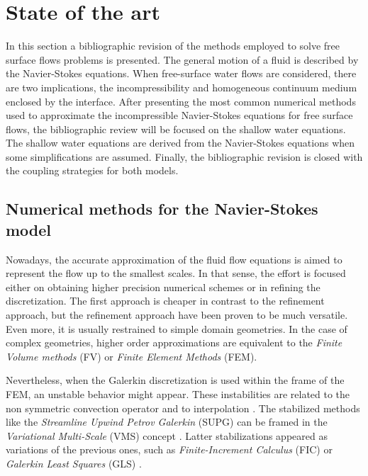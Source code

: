 
\section{State of the art}
\label{state_art}


In this section a bibliographic revision of the methods employed to solve free surface flows problems is presented.
The general motion of a fluid is described by the Navier-Stokes equations. When free-surface water flows are considered, there are two implications, the incompressibility and homogeneous continuum medium enclosed by the interface. After presenting the most common numerical methods used to approximate the incompressible Navier-Stokes equations for free surface flows, the bibliographic review will be focused on the shallow water equations.
The shallow water equations are derived from the Navier-Stokes equations when some simplifications are assumed.
Finally, the bibliographic revision is closed with the coupling strategies for both models.



\subsection{Numerical methods for the Navier-Stokes model}


Nowadays, the accurate approximation of the fluid flow equations is aimed to represent the flow up to the smallest scales. In that sense, the effort is focused either on obtaining higher precision numerical schemes or in refining the discretization. The first approach is cheaper in contrast to the refinement approach, but the refinement approach have been proven to be much versatile. Even more, it is usually restrained to simple domain geometries. In the case of complex geometries, higher order approximations are equivalent to the \emph{Finite Volume methods} (FV) or \emph{Finite Element Methods} (FEM).

Nevertheless, when the Galerkin discretization is used within the frame of the FEM, an unstable behavior might appear. These instabilities are related to the non symmetric convection operator and to interpolation \cite{BrezziFortin,codina2008oseen}. The stabilized methods like the \emph{Streamline Upwind Petrov Galerkin} (SUPG) \cite{hughes1986iii,brooks1982} can be framed in the \emph{Variational Multi-Scale} (VMS) concept \cite{hughes1995}. Latter stabilizations appeared as variations of the previous ones, such as \emph{Finite-Increment Calculus} (FIC) \cite{onate1998} or \emph{Galerkin Least Squares} (GLS) \cite{hughes1989}.


